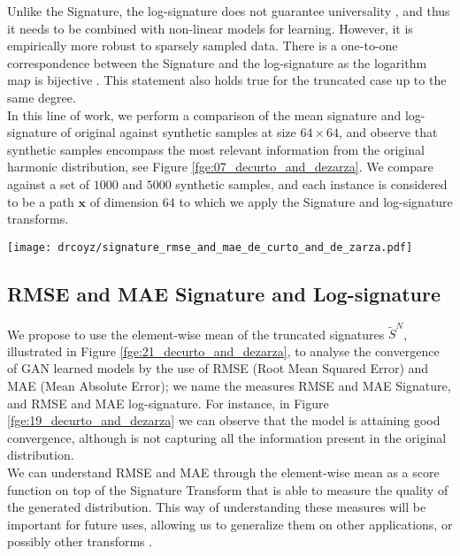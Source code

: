 \documentclass[lettersize,journal]{IEEEtran}
\begin{document}
Unlike the Signature, the log-signature does not guarantee universality \cite{Lyons2014}, and thus it needs to be combined with non-linear models for learning. However, it is empirically more robust to sparsely sampled data. There is a one-to-one correspondence between the Signature and the log-signature as the logarithm map is bijective \cite{Lyons2007,Liao2019}. This statement also holds true for the truncated case up to the same degree.
\\

In this line of work, we perform a comparison of the mean signature and log-signature of original against synthetic samples at size $64\times64$, and observe that synthetic samples encompass the most relevant information from the original harmonic distribution, see Figure \ref{fge:07_decurto_and_dezarza}. We compare against a set of $1000$ and $5000$ synthetic samples, and each instance is considered to be a path $\mathbf x$ of dimension $64$ to which we apply the Signature and log-signature transforms.

\begin{figure*}[ht]
\centering
\texttt{[image: drcoyz/signature\_rmse\_and\_mae\_de\_curto\_and\_de\_zarza.pdf]}
\caption{Visual explanation of the use of $\tilde{S}^{N}$ to analyze GAN convergence. Samples are resized at $64\times64$ and transformed to grayscale previous to the computation of the signatures. The procedure used for log-signature $\log \tilde{S}^{N}$ is analogous.}
\label{fge:21_decurto_and_dezarza}
\end{figure*}

\subsection{RMSE and MAE Signature and Log-signature}
We propose to use the element-wise mean of the truncated signatures $\tilde{S}^{N}$, illustrated in Figure \ref{fge:21_decurto_and_dezarza}, to analyse the convergence of GAN learned models by the use of RMSE (Root Mean Squared Error) and MAE (Mean Absolute Error); we name the measures RMSE and MAE Signature, and RMSE and MAE log-signature. For instance, in Figure \ref{fge:19_decurto_and_dezarza} we can observe that the model is attaining good convergence, although is not capturing all the information present in the original distribution.
\\

We can understand RMSE and MAE through the element-wise mean as a score function on top of the Signature Transform that is able to measure the quality of the generated distribution. This way of understanding these measures will be important for future uses, allowing us to generalize them on other applications, or possibly other transforms \cite{DeCurto22_3}. 
\end{document}
